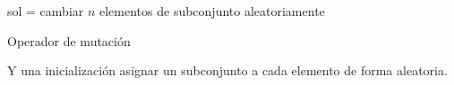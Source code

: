 \documentclass[13pt,a4paper]{article}
\begin{document}
\vspace{\baselineskip}

\begin{algorithm}[H]
    \SetAlgoLined
        sol = cambiar $n$ elementos de subconjunto aleatoriamente \;
    \caption{Operador de mutación}
\end{algorithm}

\vspace{\baselineskip}

Y una inicialización asignar un subconjunto a cada elemento de forma aleatoria.






    \setlength{\parskip}{1em}
    \newpage
\end{document}
